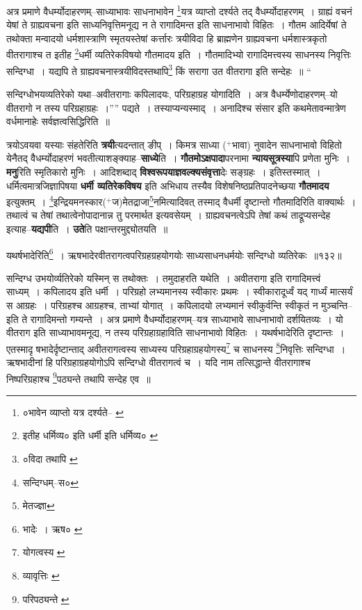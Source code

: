 \documentclass[article,12pt,a4paper]{memoir}
\newcommand{\add}[1]{($^{+}$#1)}
\begin{document}
	अत्र प्रमाणे वैधर्म्योदाहरणम्--साध्याभावः साधनाभावेन \footnote{०भावेन व्याप्तो यत्र दर्श्यते--\cite{dp-msA} \cite{dp-edP} \cite{dp-edH} \cite{dp-edE}}\-यत्र व्याप्तो दर्श्यते तद् वैधर्म्योदाहरणम् । ग्राह्यं वचनं येषां ते ग्राह्यवचना इति साध्यनिवृत्तिमनूद्य न ते रागादिमन्त इति साधनाभावो विहितः । गौतम आदिर्येषां ते तथोक्ता मन्वादयो धर्मशास्त्राणि स्मृतयस्तेषां कर्त्तारः त्रयीविदा हि ब्राह्मणेन ग्राह्यवचना धर्मशास्त्रकृतो वीतरागाश्च त इतीह \footnote{इतीह धर्मिव्य० \cite{dp-msC} \cite{dp-msD} इति धर्मी \cite{dp-msA} \cite{dp-edP} \cite{dp-edH} \cite{dp-edN} इति धर्मिव्य० \cite{dp-edE}}\-धर्मी व्यतिरेकविषयो गौतमादय इति । गौतमादिभ्यो रागादिमत्त्वस्य साधनस्य निवृत्तिः सन्दिग्धा । यद्यपि ते ग्राह्यवचनास्त्रयीविदस्तथापि\footnote{०विदा तथापि \cite{dp-msA} \cite{dp-edP} \cite{dp-edH} \cite{dp-edE} \cite{dp-edN}} किं सरागा उत वीतरागा इति सन्देहः ॥ “
	  
	सन्दिग्धोभयव्यतिरेको यथा--अवीतरागाः कपिलादयः, परिग्रहाग्रह योगादिति । अत्र वैधर्म्येणोदाहरणम्--यो वीतरागो न तस्य परिग्रहाग्रहः ।”” पद्यते । तस्याप्यन्यस्माद् । अनादिश्च संसार इति कथमेतावन्मात्रेण वर्धमानाहेः सर्वज्ञत्वसिद्धिरिति ॥
	\pend
      

	  \pstart त्रयोऽवयवा यस्याः संहतेरिति \textbf{त्रयी}त्यदन्तात् ङीप् । किमत्र साध्या \add{भावा} नुवादेन साधनाभावो विहितो येनैतद् वैधर्म्योदाहरणं भवतीत्याशङ्क्याह--\textbf{साध्ये}ति । \textbf{गौतमोऽक्षपादा}परनामा \textbf{न्यायसूत्रस्या}पि प्रणेता मुनिः । \textbf{मनु}रिति स्मृतिकारो मुनिः । आदिशब्दाद् \textbf{विश्वरूपयाज्ञवल्क्यसंवृत्ता}देः सङ्ग्रहः । इतिस्तस्मात् । धर्मित्वमात्रजिज्ञापिषया \textbf{धर्मी व्यतिरेकविषय} इति अभिधाय तस्यैव विशेषनिष्ठप्रतिपादनेच्छया \textbf{गौतमादय} इत्युक्तम् । \footnote{सन्दिग्धम्--स०}\-इन्द्रियमनस्कार\add{ज}मेतद्राजा\footnote{मेतज्ज्ञा}\-नमित्यादिवत् तस्माद् वैधर्मी दृष्टान्तो गौतमादिरिति वाक्यार्थः । तथात्वं च तेषां तथात्वेनोपादानान्न तु परमार्थत इत्यवसेयम् । ग्राह्यवचनत्वेऽपि तेषां कथं ताद्रूप्यसन्देह इत्याह--\textbf{यद्यपी}ति । \textbf{उते}ति पक्षान्तरमुद्द्योतयति ॥
	\pend
	  \bigskip
	  \begingroup
	
	  \bigskip
	  \begingroup
	

	  \pstart यथर्षभादेरिति\footnote{भादेः । ऋष० \cite{dp-msC}} । ऋषभादेरवीतरागत्वपरिग्रहग्रहयोगयोः साध्यसाधनधर्मयोः सन्दिग्धो व्यतिरेकः ॥१३२॥
	\pend
      
	  \endgroup
	 

	  \pstart सन्दिग्ध उभयोर्व्यतिरेको यस्मिन् स तथोक्तः । तमुदाहरति यथेति । अवीतरागा इति रागादिमत्त्वं साध्यम् । कपिलादय इति धर्मी । परिग्रहो लभ्यमानस्य स्वीकारः प्रथमः । स्वीकारादूर्ध्वं यद् गार्ध्यं मात्सर्यं स आग्रहः । परिग्रहश्च आग्रहश्च, ताभ्यां योगात् । कपिलादयो लभ्यमानं स्वीकुर्वन्ति स्वीकृतं न मुञ्चन्ति--इति ते रागादिमन्तो गम्यन्ते । अत्र प्रमाणे वैधर्म्योदाहरणम्--यत्र साध्याभावे साधनाभावो दर्शयितव्यः । यो वीतराग इति साध्याभावमनूद्य, न तस्य परिग्रहाग्रहाविति साधनाभावो विहितः । यथर्षभादेरिति दृष्टान्तः । एतस्मादृ षभादेर्दृष्टान्ताद् अवीतरागत्वस्य साध्यस्य परिग्रहाग्रहयोगस्य\footnote{योगत्वस्य \cite{dp-msA}} च साधनस्य \footnote{व्यावृत्तिः \cite{dp-msC} \cite{dp-edE}}\-निवृत्तिः सन्दिग्धा । ऋषभादीनां हि परिग्रहाग्रहयोगोऽपि सन्दिग्धो वीतरागत्वं च । यदि नाम तत्सिद्धान्ते वीतरागाश्च निष्परिग्रहाश्च \footnote{परिपठ्यन्ते \cite{dp-msD}}\-पठ्यन्ते तथापि सन्देह एव ॥
	\pend
       
\end{document}

